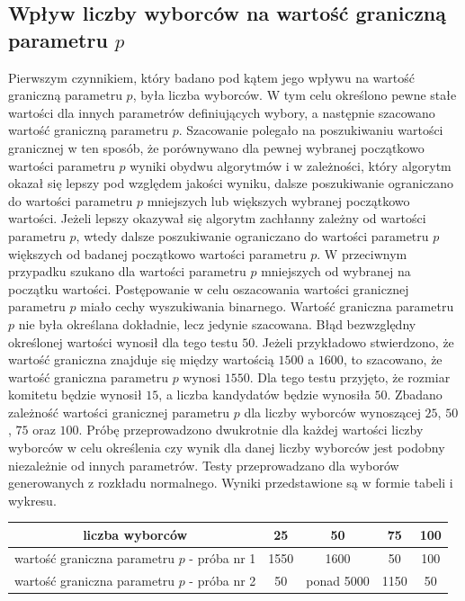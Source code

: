 \documentclass[pdflatex,11pt]{../aghdoc_version2}
\begin{document}
\subsection{Wpływ liczby wyborców na wartość graniczną parametru $p$}
Pierwszym czynnikiem, który badano pod kątem jego wpływu na wartość graniczną parametru $p$, była liczba wyborców. W tym celu określono pewne stałe wartości dla innych parametrów definiujących wybory, a następnie szacowano wartość graniczną parametru $p$. Szacowanie polegało na poszukiwaniu wartości granicznej w ten sposób, że porównywano dla pewnej wybranej początkowo wartości parametru $p$ wyniki obydwu algorytmów i w zależności, który algorytm okazał się lepszy pod względem jakości wyniku, dalsze poszukiwanie ograniczano do wartości parametru $p$ mniejszych lub większych wybranej początkowo wartości. Jeżeli lepszy okazywał się algorytm zachłanny zależny od wartości parametru $p$, wtedy dalsze poszukiwanie ograniczano do wartości parametru $p$ większych od badanej początkowo wartości parametru $p$. W przeciwnym przypadku szukano dla wartości parametru $p$ mniejszych od wybranej na początku wartości. Postępowanie w celu oszacowania wartości granicznej parametru $p$ miało cechy wyszukiwania binarnego. Wartość graniczna parametru $p$ nie była określana dokładnie, lecz jedynie szacowana. Błąd bezwzględny określonej wartości wynosił dla tego testu $50$. Jeżeli przykładowo stwierdzono, że wartość graniczna znajduje się między wartością $1500$ a $1600$, to szacowano, że wartość graniczna parametru $p$ wynosi $1550$. Dla tego testu przyjęto, że rozmiar komitetu będzie wynosił $15$, a liczba kandydatów będzie wynosiła $50$. Zbadano zależność wartości granicznej parametru $p$ dla liczby wyborców wynoszącej $25$, $50$, $75$ oraz $100$. Próbę przeprowadzono dwukrotnie dla każdej wartości liczby wyborców w celu określenia czy wynik dla danej liczby wyborców jest podobny niezależnie od innych parametrów. Testy przeprowadzano dla wyborów generowanych z rozkładu normalnego. Wyniki przedstawione są w formie tabeli i wykresu. \\ 

\begin{center}

\begin{tabular}{|c|c|c|c|c|}
   \hline 
   liczba wyborców & 25 & 50 & 75 & 100 \\ 
   \hline 
   wartość graniczna parametru $p$ - próba nr 1 & 1550 & 1600 & 50 & 100 \\ 
   \hline 
   wartość graniczna parametru $p$ - próba nr 2 & 50 & ponad 5000 & 1150 & 50 \\ 
   \hline 
\end{tabular}    
\end{center}
\end{document}
